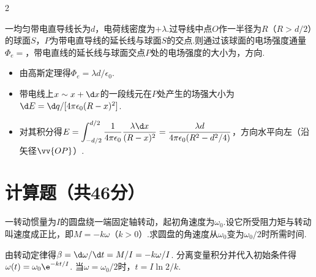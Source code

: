 \begin{paracol}{2}
\begin{problem} %
    一均匀带电直导线长为$d$，电荷线密度为$+\lambda$.过导线中点$O$作一半径为$R$（$R>d/2$）的球面$S$，$P$为带电直导线的延长线与球面$S$的交点.则通过该球面的电场强度通量$\Phi_e=$，带电直线的延长线与球面交点$P$处的电场强度的大小为，方向.
    \switchcolumn\vspace*{\fill}\centering
    \vspace*{\fill}
\end{problem}
\end{paracol}
\begin{solution}\leavevmode
    \begin{itemize}
        \item 由高斯定理得$\Phi_e=\lambda d/\epsilon_0$.
        \item 带电线上$x\sim x+\d x$的一段线元在$P$处产生的场强大小为$\d E=\d q/[4\pi\epsilon_0(R-x)^2]$.
        \item 对其积分得$E=\displaystyle\int_{-d/2}^{d/2}\frac{1}{4\pi\epsilon_0}\frac{\lambda\d x}{(R-x)^2}=\frac{\lambda d}{4\pi\epsilon_0(R^2-d^2/4)}$，方向水平向左（沿矢径$\vv{OP}$）.
    \end{itemize}
\end{solution}

\section{计算题（共46分）}

\begin{problem} %
    一转动惯量为$I$的圆盘绕一端固定轴转动，起初角速度为$\omega_0$.设它所受阻力矩与转动叫速度成正比，即$M=-k\omega$（$k>0$）.求圆盘的角速度从$\omega_0$变为$\omega_0/2$时所需时间.
\end{problem}
\begin{solution}
    由转动定律得$\beta=\d\omega/\d t=M/I=-k\omega/I$. 分离变量积分并代入初始条件得$\omega(t)=\omega_0\e^{-kt/I}$. 当$\omega=\omega_0/2$时，$t=I\ln 2/k$.
\end{solution}

